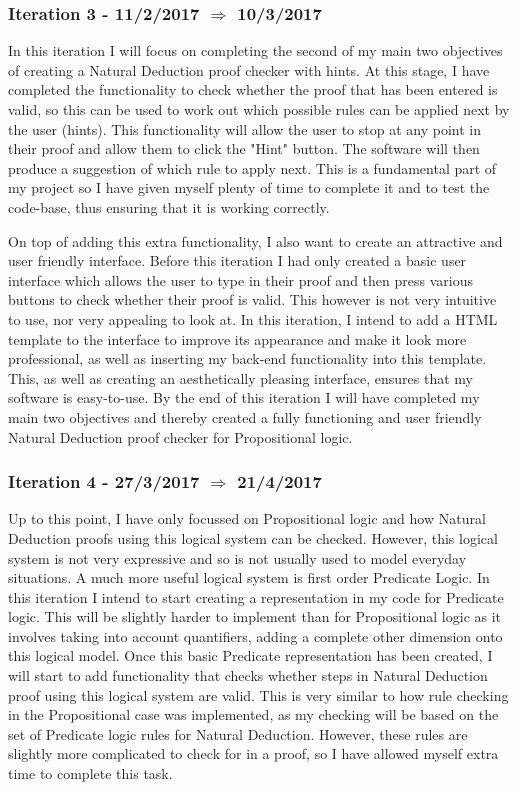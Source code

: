\subsubsection{Iteration 3 - 11/2/2017 $\Rightarrow$ 10/3/2017}

In this iteration I will focus on completing the second of my main two objectives of creating a Natural Deduction proof checker with hints. At this stage, I have completed the functionality to check whether the proof that has been entered is valid, so this can be used to work out which possible rules can be applied next by the user (hints). This functionality will allow the user to stop at any point in their proof and allow them to click the "Hint" button. The software will then produce a suggestion of which rule to apply next. This is a fundamental part of my project so I have given myself plenty of time to complete it and to test the code-base, thus ensuring that it is working correctly.

On top of adding this extra functionality, I also want to create an attractive and user friendly interface. Before this iteration I had only created a basic user interface which allows the user to type in their proof and then press various buttons to check whether their proof is valid. This however is not very intuitive to use, nor very appealing to look at. In this iteration, I intend to add a HTML template to the interface to improve its appearance and make it look more professional, as well as inserting my back-end functionality into this template. This, as well as creating an aesthetically pleasing interface, ensures that my software is easy-to-use. By the end of this iteration I will have completed my main two objectives and thereby created a fully functioning and user friendly Natural Deduction proof checker for Propositional logic.

\subsubsection{Iteration 4 - 27/3/2017 $\Rightarrow$ 21/4/2017}

Up to this point, I have only focussed on Propositional logic and how Natural Deduction proofs using this logical system can be checked. However, this logical system is not very expressive and so is not usually used to model everyday situations. A much more useful logical system is first order Predicate Logic. In this iteration I intend to start creating a representation in my code for Predicate logic. This will be slightly harder to implement than for Propositional logic as it involves taking into account quantifiers, adding a complete other dimension onto this logical model. Once this basic Predicate representation has been created, I will start to add functionality that checks whether steps in Natural Deduction proof using this logical system are valid. This is very similar to how rule checking in the Propositional case was implemented, as my checking will be based on the set of Predicate logic rules for Natural Deduction. However, these rules are slightly more complicated to check for in a proof, so I have allowed myself extra time to complete this task. 

